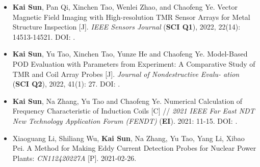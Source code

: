 \begin{itemize}[leftmargin=1.5em]
    \item \textbf{Kai Sun}, Pan Qi, Xinchen Tao, Wenlei Zhao, and Chaofeng Ye. Vector Magnetic Field Imaging with High-resolution TMR Sensor Arrays for Metal Structure Inspection [J]. \textsl{IEEE Sensors Journal} (\textbf{SCI Q1}), 2022, 22(14): 14513-14521. DOI: .
    \\{ \footnotesize {}}

    \item \textbf{Kai Sun}, Yu Tao, Xinchen Tao, Yunze He and Chaofeng Ye. Model-Based POD Evaluation with Parameters from Experiment: A Comparative Study of TMR and Coil Array Probes [J]. \textsl{Journal of Nondestructive Evalu- ation} (\textbf{SCI Q2}), 2022, 41(1): 27. DOI: .
    \\{ \footnotesize {}}

    \item \textbf{Kai Sun}, Na Zhang, Yu Tao and Chaofeng Ye. Numerical Calculation of Frequency Characteristic of Induction Coils [C] // \textsl{2021 IEEE Far East NDT New Technology Application Forum (FENDT)} (\textbf{EI}). 2021: 11-15. DOI: .
    \\{ \footnotesize {}}

    \item Xiaoguang Li, Shiliang Wu, \textbf{Kai Sun}, Na Zhang, Yu Tao, Yang Li, Xibao Pei. A Method for Making Eddy Current Detection Probes for Nuclear Power Plants: \textsl{CN112420227A} [P]. 2021-02-26.
\end{itemize}
\fi